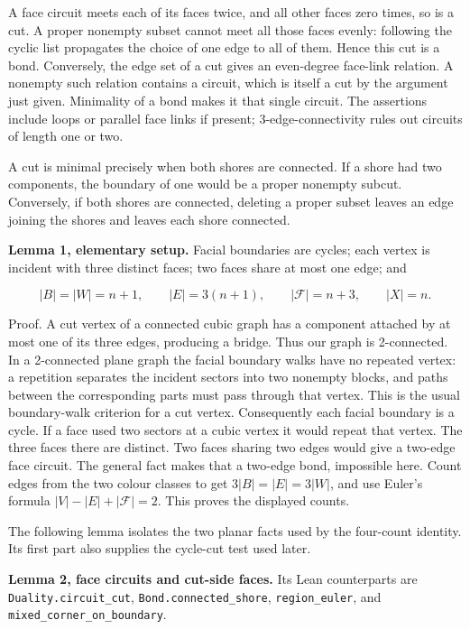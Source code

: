 \documentclass[a4paper,11pt]{amsart}
\begin{document}
A face circuit meets each of its faces twice, and all other faces zero times, so is a cut. A proper nonempty subset cannot meet all those faces evenly: following the cyclic list propagates the choice of one edge to all of them. Hence this cut is a bond. Conversely, the edge set of a cut gives an even-degree face-link relation. A nonempty such relation contains a circuit, which is itself a cut by the argument just given. Minimality of a bond makes it that single circuit. The assertions include loops or parallel face links if present; 3-edge-connectivity rules out circuits of length one or two.

A cut is minimal precisely when both shores are connected. If a shore had two components, the boundary of one would be a proper nonempty subcut. Conversely, if both shores are connected, deleting a proper subset leaves an edge joining the shores and leaves each shore connected.

\textbf{Lemma 1, elementary setup.} Facial boundaries are cycles; each vertex is incident with three distinct faces; two faces share at most one edge; and

\begin{equation*}
|B|=|W|=n+1,\qquad |E|=3(n+1),\qquad |\mathcal F|=n+3,\qquad |X|=n.
\end{equation*}

Proof. A cut vertex of a connected cubic graph has a component attached by at most one of its three edges, producing a bridge. Thus our graph is 2-connected. In a 2-connected plane graph the facial boundary walks have no repeated vertex: a repetition separates the incident sectors into two nonempty blocks, and paths between the corresponding parts must pass through that vertex. This is the usual boundary-walk criterion for a cut vertex. Consequently each facial boundary is a cycle. If a face used two sectors at a cubic vertex it would repeat that vertex. The three faces there are distinct. Two faces sharing two edges would give a two-edge face circuit. The general fact makes that a two-edge bond, impossible here. Count edges from the two colour classes to get $3|B|=|E|=3|W|$, and use Euler's formula $|V|-|E|+|\mathcal F|=2$. This proves the displayed counts.

The following lemma isolates the two planar facts used by the four-count identity. Its first part also supplies the cycle-cut test used later.

\textbf{Lemma 2, face circuits and cut-side faces.} Its Lean counterparts are \nolinkurl{Duality.circuit_cut}, \nolinkurl{Bond.connected_shore}, \nolinkurl{region_euler}, and \nolinkurl{mixed_corner_on_boundary}.
\end{document}
